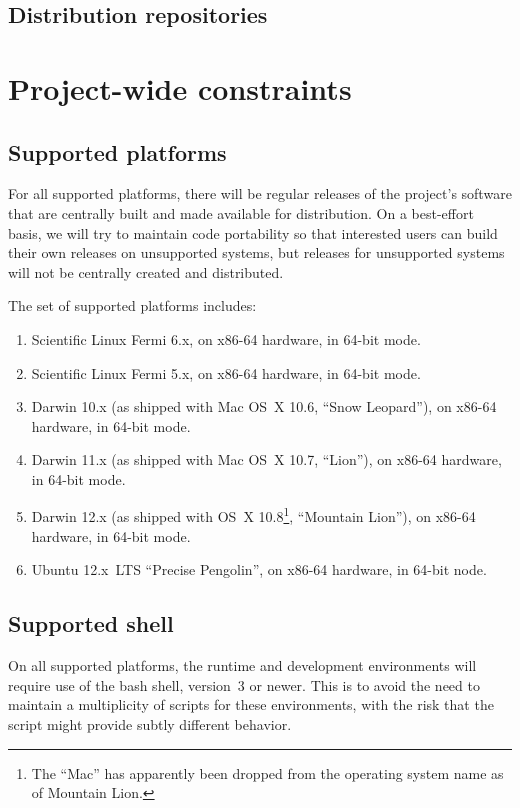 \documentclass[draftmode,draftwater]{memarticle}
\begin{document}
\subsection{Distribution repositories}


\section{Project-wide constraints}

\subsection{Supported platforms}

For all supported platforms, there will be regular releases of the
project's software that are centrally built and made available for
distribution. On a best-effort basis, we will try to maintain code
portability so that interested users can build their own releases on
unsupported systems, but releases for unsupported systems will not be
centrally created and distributed.

The set of supported platforms includes:
\begin{enumerate}
   \item Scientific Linux Fermi 6.x, on x86-64 hardware, in 64-bit mode.
   \item Scientific Linux Fermi 5.x, on x86-64 hardware, in 64-bit mode.
   \item Darwin 10.x (as shipped with Mac OS~X 10.6, ``Snow Leopard''),
     on x86-64 hardware, in 64-bit mode.
   \item Darwin 11.x (as shipped with Mac OS~X 10.7, ``Lion''), on
     x86-64 hardware, in 64-bit mode.
   \item Darwin 12.x (as shipped with OS~X 10.8\footnote{The ``Mac'' has
     apparently been dropped from the operating system name as of
     Mountain Lion.}, ``Mountain Lion''), on
     x86-64 hardware, in 64-bit mode.
   \item Ubuntu 12.x~LTS ``Precise Pengolin'', on x86-64 hardware, in
     64-bit node.
\end{enumerate}

\subsection{Supported shell}

On all supported platforms, the runtime and development environments
will require use of the bash shell, version~3 or newer. This is to avoid
the need to maintain a multiplicity of scripts for these environments,
with the risk that the script might provide subtly different behavior.
\end{document}
